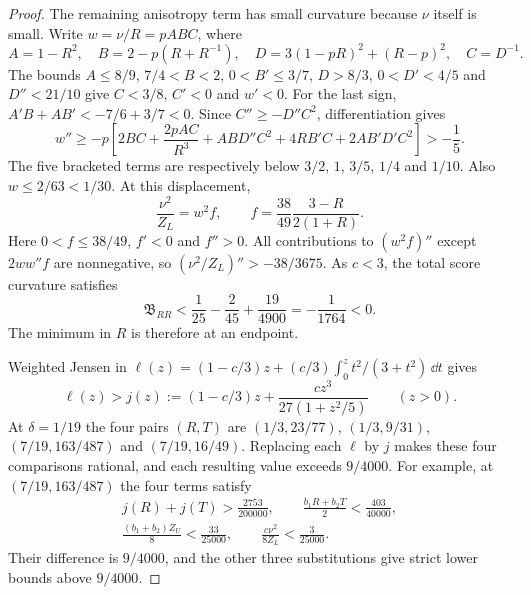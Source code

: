 \begin{proof}
The remaining anisotropy term has small curvature because $\nu$ itself is small.
Write $w=\nu/R=pABC$, where
\[
 A=1-R^2,\quad B=2-p(R+R^{-1}),\quad
 D=3(1-pR)^2+(R-p)^2,\quad C=D^{-1}.
\]
The bounds $A\le8/9$, $7/4<B<2$, $0<B'\le3/7$, $D>8/3$,
$0<D'<4/5$ and $D''<21/10$ give $C<3/8$, $C'<0$ and $w'<0$.
For the last sign, $A'B+AB'<-7/6+3/7<0$.
Since $C''\ge-D''C^2$, differentiation gives
\[
 w''\ge-p\left[2BC+\frac{2pAC}{R^3}
          +ABD''C^2+4RB'C+2AB'D'C^2\right]>-\frac15 .
\]
The five bracketed terms are respectively below $3/2$, $1$, $3/5$, $1/4$ and $1/10$.
Also $w\le2/63<1/30$. At this displacement,
\[
 \frac{\nu^2}{Z_L}=w^2f,\qquad
 f=\frac{38}{49}\frac{3-R}{2(1+R)}.
\]
Here $0<f\le38/49$, $f'<0$ and $f''>0$. All contributions to $(w^2f)''$ except
$2ww''f$ are nonnegative, so
$(\nu^2/Z_L)''>-38/3675$. As $c<3$, the total score curvature satisfies
\[
 \mathfrak B_{RR}<\frac1{25}-\frac2{45}+\frac{19}{4900}
 =-\frac1{1764}<0.
\]
The minimum in $R$ is therefore at an endpoint.

 Weighted Jensen in
$\ell(z)=(1-c/3)z+(c/3)\int_0^z t^2/(3+t^2)\,\dd t$ gives
\[
 \ell(z)>j(z):=(1-c/3)z+\frac{cz^3}{27(1+z^2/5)}\qquad(z>0).
\]
At $\delta=1/19$ the four pairs $(R,T)$ are
$(1/3,23/77)$, $(1/3,9/31)$, $(7/19,163/487)$ and $(7/19,16/49)$.
Replacing each $\ell$ by $j$ makes these four comparisons rational, and each resulting value
exceeds $9/4000$. For example, at $(7/19,163/487)$ the four terms satisfy
\begin{gather*}
 j(R)+j(T)>\frac{2753}{200000},\qquad
 \frac{b_1R+b_2T}{2}<\frac{403}{40000},\\
 \frac{(b_1+b_2)Z_U}{8}<\frac{33}{25000},\qquad
 \frac{c\nu^2}{8Z_L}<\frac3{25000}.
\end{gather*}
Their difference is $9/4000$, and the other three substitutions give strict lower bounds
above $9/4000$.
\end{proof}
